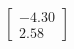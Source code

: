\documentclass[preview]{standalone}
\begin{document}
\begin{align*}
\begin{bmatrix} -4.30 \\ 2.58 \end{bmatrix}
\end{align*}
\end{document}

